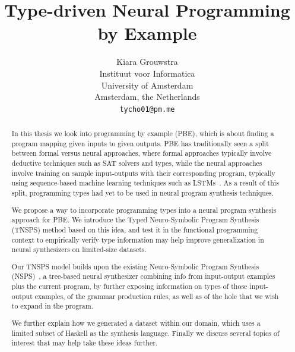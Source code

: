 \documentclass{article} %
\title{Type-driven Neural Programming by Example}
\author{
   Kiara Grouwstra
   \\
   Instituut voor Informatica\\
   University of Amsterdam\\
   Amsterdam, the Netherlands \\
   \texttt{tycho01@pm.me} \\
}
\begin{document}
% 


\maketitle




\tableofcontents


\begin{abstract}

   In this thesis we look into programming by example (PBE),
   which is about finding a program mapping given inputs to given outputs.
   PBE has traditionally seen a split between formal versus neural approaches,
   where formal approaches typically involve deductive techniques such as SAT solvers and types,
   while the neural approaches involve training on sample input-outputs with their corresponding program,
   typically using sequence-based machine learning techniques such as LSTMs~\citep{lstm}.
   As a result of this split, programming types had yet to be used in neural program synthesis techniques.

   We propose a way to incorporate programming types into a neural program synthesis approach for PBE.
   We introduce the Typed Neuro-Symbolic Program Synthesis (TNSPS) method based on this idea,
   and test it in the functional programming context to empirically verify type information
   may help improve generalization in neural synthesizers on limited-size datasets.

   Our TNSPS model builds upon the existing Neuro-Symbolic Program Synthesis (NSPS)~\citep{nsps},
   a tree-based neural synthesizer combining info from input-output examples plus the current program,
   by further exposing information on types of those input-output examples,
   of the grammar production rules, as well as of the hole that we wish to expand in the program.

   We further explain how we generated a dataset within our domain,
   which uses a limited subset of Haskell as the synthesis language.
   Finally we discuss several topics of interest that may help take these ideas further.

\end{abstract}
\end{document}

